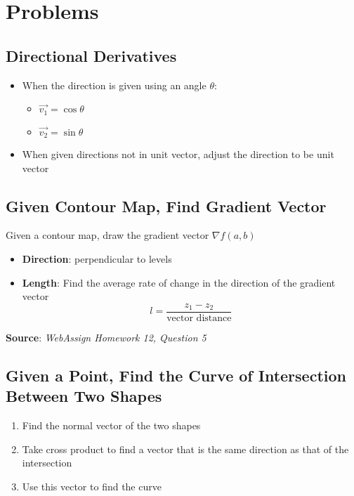\section{Problems}

  \subsection{Directional Derivatives}

    \begin{itemize}
      \item When the direction is given using an angle $ \theta $:
      \begin{itemize}
        \item $ \vec{v_{1}} = \cos\theta $
        \item $ \vec{v_{2}} = \sin\theta $
      \end{itemize}

      \item When given directions not in unit vector, adjust the direction
      to be unit vector
    \end{itemize}

  \subsection{Given Contour Map, Find Gradient Vector}

    Given a contour map, draw the gradient vector
    $ \nabla f\left( a, b \right) $

    \begin{itemize}
      \item \textbf{Direction}: perpendicular to levels
      \item \textbf{Length}: Find the average rate of change in the direction
      of the gradient vector
      \begin{displaymath}
        l = \frac{z_{1} - z_{2}}{\text{vector distance}}
      \end{displaymath}
    \end{itemize}

    \textbf{Source}: \textit{WebAssign Homework 12, Question 5}

  \subsection{Given a Point, Find the Curve of Intersection Between Two Shapes}

    \begin{enumerate}
      \item Find the normal vector of the two shapes
      \item Take cross product to find a vector that is the same direction
      as that of the intersection
      \item Use this vector to find the curve
    \end{enumerate}